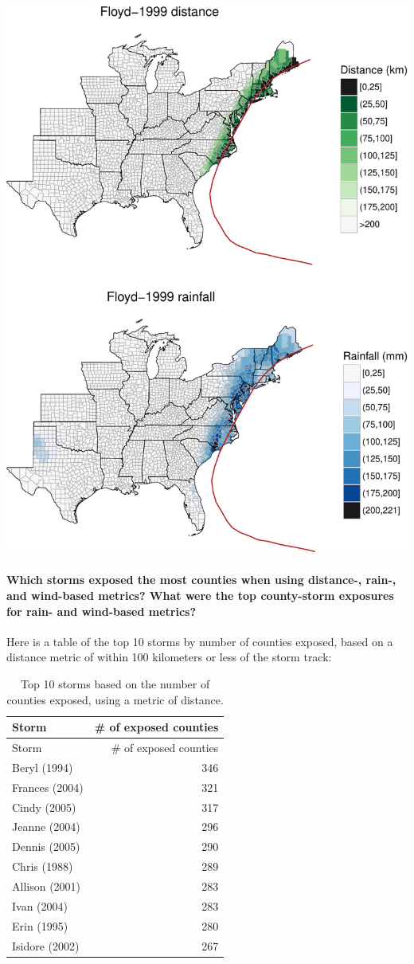 \documentclass[]{elsarticle} %
\makeatletter
\def\maxwidth{\ifdim\Gin@nat@width>\linewidth\linewidth
\else\Gin@nat@width\fi}
\let\Oldincludegraphics\includegraphics
\renewcommand{\includegraphics}[1]{\Oldincludegraphics[width=\maxwidth]{#1}}
\makeatother
\begin{document}
\includegraphics{DraftExposurePaper_files/figure-latex/unnamed-chunk-8-1.pdf}

\paragraph{Which storms exposed the most counties when using distance-,
rain-, and wind-based metrics? What were the top county-storm exposures
for rain- and wind-based
metrics?}\label{which-storms-exposed-the-most-counties-when-using-distance--rain--and-wind-based-metrics-what-were-the-top-county-storm-exposures-for-rain--and-wind-based-metrics}

Here is a table of the top 10 storms by number of counties exposed,
based on a distance metric of within 100 kilometers or less of the storm
track:

\begin{longtable}[]{@{}lr@{}}
\caption{Top 10 storms based on the number of counties exposed, using a
metric of distance.}\tabularnewline
\toprule
Storm & \# of exposed counties\tabularnewline
\midrule
\endfirsthead
\toprule
Storm & \# of exposed counties\tabularnewline
\midrule
\endhead
Beryl (1994) & 346\tabularnewline
Frances (2004) & 321\tabularnewline
Cindy (2005) & 317\tabularnewline
Jeanne (2004) & 296\tabularnewline
Dennis (2005) & 290\tabularnewline
Chris (1988) & 289\tabularnewline
Allison (2001) & 283\tabularnewline
Ivan (2004) & 283\tabularnewline
Erin (1995) & 280\tabularnewline
Isidore (2002) & 267\tabularnewline
\bottomrule
\end{longtable}
\end{document}
